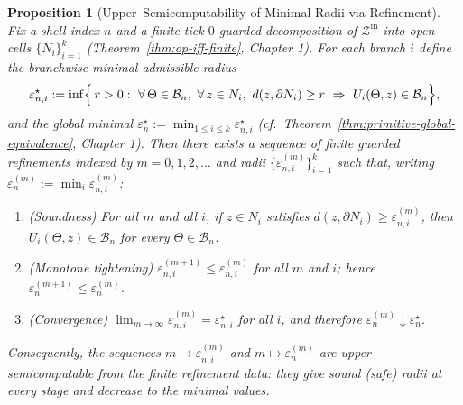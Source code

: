 \documentclass[12pt]{article}
\theoremstyle{definition}
\theoremstyle{plain}
\newtheorem{proposition}{Proposition}[section]
\begin{document}
\begin{proposition}[Upper–Semicomputability of Minimal Radii via Refinement]
\label{prop:upper-semi-eps}
Fix a shell index $n$ and a finite tick-$0$ guarded decomposition of $\mathcal Z^{\mathrm{in}}$ into open cells
$\{N_i\}_{i=1}^k$ (Theorem~\ref{thm:op-iff-finite}, Chapter 1). For each branch $i$ define the branchwise minimal admissible
radius
\[
  \varepsilon_{n,i}^\star
  := \inf\Bigl\{\, r>0:\ \forall\,\Theta\in\mathcal B_n,\ \forall\,z\in N_i,\ d(z,\partial N_i)\ge r\ \Rightarrow\ U_i(\Theta,z)\in\mathcal B_n \Bigr\},
\]
and the global minimal $\varepsilon_n^\star:=\min_{1\le i\le k}\varepsilon_{n,i}^\star$ (cf.\ Theorem~\ref{thm:primitive-global-equivalence}, Chapter 1).
Then there exists a sequence of finite guarded refinements indexed by $m=0,1,2,\ldots$ and radii
$\{\varepsilon_{n,i}^{(m)}\}_{i=1}^k$ such that, writing $\varepsilon_n^{(m)}:=\min_i \varepsilon_{n,i}^{(m)}$:
\begin{enumerate}[label=(\alph*), leftmargin=2em]
  \item (\emph{Soundness}) For all $m$ and all $i$, if $z\in N_i$ satisfies $d(z,\partial N_i)\ge \varepsilon_{n,i}^{(m)}$, then
        $U_i(\Theta,z)\in\mathcal B_n$ for every $\Theta\in\mathcal B_n$.
  \item (\emph{Monotone tightening}) $\varepsilon_{n,i}^{(m+1)}\le \varepsilon_{n,i}^{(m)}$ for all $m$ and $i$; hence
        $\varepsilon_n^{(m+1)}\le \varepsilon_n^{(m)}$.
  \item (\emph{Convergence}) $\lim_{m\to\infty}\varepsilon_{n,i}^{(m)}=\varepsilon_{n,i}^\star$ for all $i$, and therefore
        $\varepsilon_n^{(m)}\downarrow \varepsilon_n^\star$.
\end{enumerate}
Consequently, the sequences $m\mapsto \varepsilon_{n,i}^{(m)}$ and $m\mapsto \varepsilon_n^{(m)}$ are
\emph{upper–semicomputable} from the finite refinement data: they give sound (safe) radii at every stage and
decrease to the minimal values.
\end{proposition}
\end{document}
